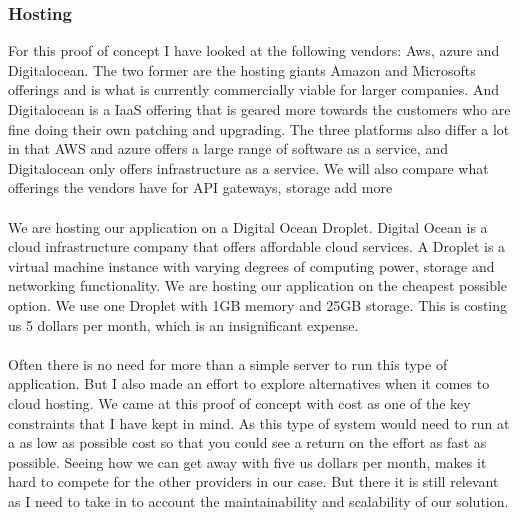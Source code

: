 \documentclass[]{uiophd}
\begin{document}
\subsubsection{Hosting}
For this proof of concept I have looked at the following vendors: Aws, azure and Digitalocean. The two former are the hosting giants Amazon and Microsofts offerings and is what is currently commercially viable for larger companies. And Digitalocean is a IaaS offering that is geared more towards the customers who are fine doing their own patching and upgrading. The three platforms also differ a lot in that AWS and azure offers a large range of software as a service, and Digitalocean only offers infrastructure as a service. We will also compare what offerings the vendors have for API gateways, storage {add more}
\\\\
We are hosting our application on a Digital Ocean Droplet. Digital Ocean is a cloud infrastructure company that offers affordable cloud services. A Droplet is a virtual machine instance with varying degrees of computing power, storage and networking functionality. We are hosting our application on the cheapest possible option. We use one Droplet with 1GB memory and 25GB storage. This is costing us 5 dollars per month, which is an insignificant expense. 
\\\\
Often there is no need for more than a simple server to run this type of application. But I also made an effort to explore alternatives when it comes to cloud hosting. We came at this proof of concept with cost as one of the key constraints that I have kept in mind. As this type of system would need to run at a as low as possible cost so that you could see a return on the effort as fast as possible. Seeing how we can get away with five us dollars per month, makes it hard to compete for the other providers in our case. But there it is still relevant as I need to take in to account the maintainability and scalability of our solution.
\end{document}

